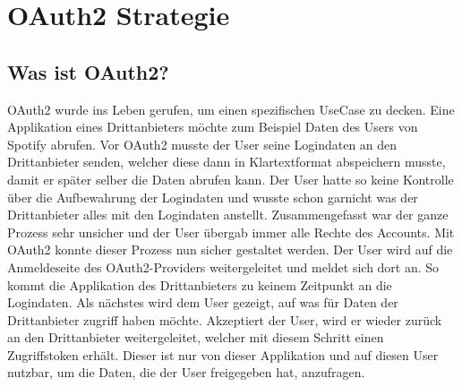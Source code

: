 \section{OAuth2 Strategie}\label{oauth2-strat}
\subsection{Was ist OAuth2?}
OAuth2 wurde ins Leben gerufen, um einen spezifischen UseCase zu decken. Eine Applikation eines Drittanbieters möchte zum Beispiel Daten des Users von Spotify abrufen. Vor OAuth2 musste der User seine Logindaten an den Drittanbieter senden, welcher diese dann in Klartextformat abspeichern musste, damit er später selber die Daten abrufen kann.
\newline
Der User hatte so keine Kontrolle über die Aufbewahrung der Logindaten und wusste schon garnicht was der Drittanbieter alles mit den Logindaten anstellt. Zusammengefasst war der ganze Prozess sehr unsicher und der User übergab immer alle Rechte des Accounts.
\newline
\newline
Mit OAuth2 konnte dieser Prozess nun sicher gestaltet werden. Der User wird auf die Anmeldeseite des OAuth2-Providers weitergeleitet und meldet sich dort an. So kommt die Applikation des Drittanbieters zu keinem Zeitpunkt an die Logindaten. Als nächstes wird dem User gezeigt, auf was für Daten der Drittanbieter zugriff haben möchte. Akzeptiert der User, wird er wieder zurück an den Drittanbieter weitergeleitet, welcher mit diesem Schritt einen Zugriffstoken erhält. Dieser ist nur von dieser Applikation und auf diesen User nutzbar, um die Daten, die der User freigegeben hat, anzufragen.
\pagebreak
